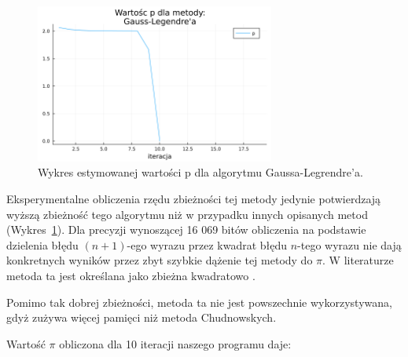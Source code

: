 \begin{figure}[!h]
    \centering
    \renewcommand{\figurename}{Wykres}
    \includegraphics[width=0.7\textwidth]{../prog/gauss_legendre_error_ratio.png}
    \caption{Wykres estymowanej wartości p dla algorytmu Gaussa-Legrendre'a.}
    \label{gauss-convergence}
\end{figure}

Eksperymentalne obliczenia rzędu zbieżności tej metody jedynie potwierdzają wyższą zbieżność tego algorytmu niż w przypadku innych opisanych metod (Wykres~\ref{gauss-convergence}). Dla precyzji wynoszącej 16 069 bitów obliczenia na podstawie dzielenia błędu $(n+1)$-ego wyrazu przez kwadrat błędu $n$-tego wyrazu nie dają konkretnych wyników przez zbyt szybkie dążenie tej metody do $\pi$. W literaturze metoda ta jest określana jako zbieżna kwadratowo \cite{gausse-smth}.

Pomimo tak dobrej zbieżności, metoda ta nie jest powszechnie wykorzystywana, gdyż zużywa więcej pamięci niż metoda Chudnowskych.

\newpage

Wartość $\pi$ obliczona dla 10 iteracji naszego programu daje:

